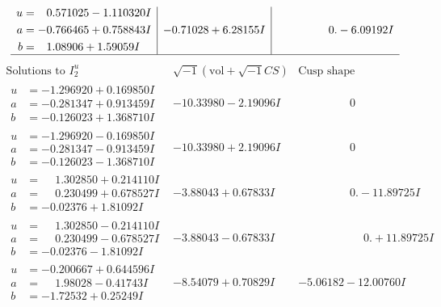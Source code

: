 \documentclass[1p]{elsarticle_modified}
\theoremstyle{definition}
\newcommand{\I}{\sqrt{-1}}
\begin{document}
$$\begin{array}{c|c|c}
\begin{aligned}
u &= \phantom{-}0.571025 - 1.110320 I \\
a &= -0.766465 + 0.758843 I \\
b &= \phantom{-}1.08906 + 1.59059 I\end{aligned}
 & -0.71028 + 6.28155 I & \phantom{-0.000000 } 0. - 6.09192 I\\
 \hline 
 \end{array}$$\newpage$$\begin{array}{c|c|c}  
\text{Solutions to }I^u_{2}& \I (\text{vol} + \sqrt{-1}CS) & \text{Cusp shape}\\
 \hline 
\begin{aligned}
u &= -1.296920 + 0.169850 I \\
a &= -0.281347 + 0.913459 I \\
b &= -0.126023 + 1.368710 I\end{aligned}
 & -10.33980 - 2.19096 I & \phantom{-0.000000 } 0 \\ \hline\begin{aligned}
u &= -1.296920 - 0.169850 I \\
a &= -0.281347 - 0.913459 I \\
b &= -0.126023 - 1.368710 I\end{aligned}
 & -10.33980 + 2.19096 I & \phantom{-0.000000 } 0 \\ \hline\begin{aligned}
u &= \phantom{-}1.302850 + 0.214110 I \\
a &= \phantom{-}0.230499 + 0.678527 I \\
b &= -0.02376 + 1.81092 I\end{aligned}
 & -3.88043 + 0.67833 I & \phantom{-0.000000 } 0. - 11.89725 I \\ \hline\begin{aligned}
u &= \phantom{-}1.302850 - 0.214110 I \\
a &= \phantom{-}0.230499 - 0.678527 I \\
b &= -0.02376 - 1.81092 I\end{aligned}
 & -3.88043 - 0.67833 I & \phantom{-0.000000 -}0. + 11.89725 I \\ \hline\begin{aligned}
u &= -0.200667 + 0.644596 I \\
a &= \phantom{-}1.98028 - 0.41743 I \\
b &= -1.72532 + 0.25249 I\end{aligned}
 & -8.54079 + 0.70829 I & -5.06182 - 12.00760 I \\ \hline\begin{aligned}

\end{aligned}
\end{array}$$
\end{document}
